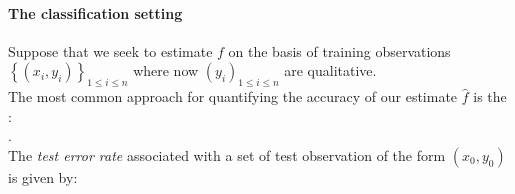 \paragraph{The classification setting}
Suppose that we seek to estimate $f$ on the basis of training 
observations $\left\{ \left( x_{i},y_{i} \right) \right\}_{1\leq i\leq
n}$ where now $\left( y_{i} \right)_{1\leq i\leq n}$ are qualitative.\\
The most common approach for quantifying the accuracy of our estimate
$\widehat{f}$ is the :\\
.\\ The \emph{test error
rate} associated with a set of test observation of the form $\left( 
x_{0},y_{0} \right)$ is given by:
